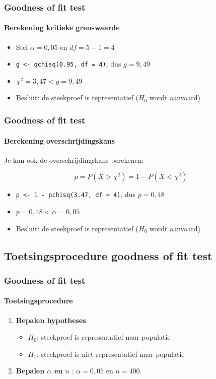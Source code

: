 \documentclass[aspectratio=169]{beamer}
\begin{document}
\begin{frame}[fragile]
  \frametitle{Goodness of fit test}
  \framesubtitle{Berekening kritieke grenswaarde}

  \begin{itemize}
    \item Stel $\alpha = 0,05$ en $df = 5 - 1 = 4$
    \item \verb|g <- qchisq(0.95, df = 4)|, dus $g = 9,49$
    \item $\chi^{2} = 3,47 < g = 9,49$
    \item Besluit: de steekproef is representatief ($H_0$ wordt aanvaard)
  \end{itemize}
\end{frame}

\begin{frame}[fragile]
\frametitle{Goodness of fit test}
\framesubtitle{Berekening overschrijdingskans}

Je kan ook de overschrijdingskans berekenen:

\[ p = P(X > \chi^2) = 1 - P(X < \chi^2) \]

\begin{itemize}
  \item \verb|p <- 1 - pchisq(3.47, df = 4)|, dus $p = 0,48$
  \item $p = 0,48 < \alpha = 0,05$
  \item Besluit: de steekproef is representatief ($H_0$ wordt aanvaard)
\end{itemize}
\end{frame}

\subsection{Toetsingsprocedure goodness of fit test}

\begin{frame}
  \frametitle{Goodness of fit test}
  \framesubtitle{Toetsingsprocedure}
  
  \begin{enumerate}
  \item \textbf{Bepalen hypotheses}
    \begin{itemize}
      \item $H_{0}$: steekproef is representatief naar populatie
      \item $H_{1}$: steekproef is niet representatief naar populatie
    \end{itemize}
  \item \textbf{Bepalen $\alpha$ en $n$} : $\alpha = 0,05$ en $n = 400$.
\end{enumerate}
\end{frame}
\end{document}
